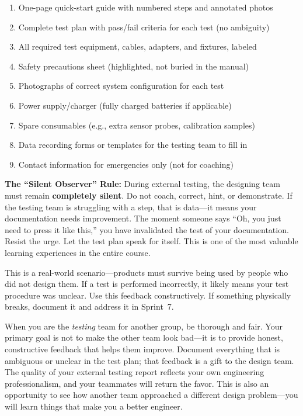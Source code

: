 \documentclass[11pt,letterpaper]{article}
\begin{document}
\begin{checklistbox}
\begin{enumerate}[leftmargin=*, itemsep=1pt, topsep=0pt]
    \item One-page quick-start guide with numbered steps and annotated photos
    \item Complete test plan with pass/fail criteria for each test (no ambiguity)
    \item All required test equipment, cables, adapters, and fixtures, labeled
    \item Safety precautions sheet (highlighted, not buried in the manual)
    \item Photographs of correct system configuration for each test
    \item Power supply/charger (fully charged batteries if applicable)
    \item Spare consumables (e.g., extra sensor probes, calibration samples)
    \item Data recording forms or templates for the testing team to fill in
    \item Contact information for emergencies only (not for coaching)
\end{enumerate}
\end{checklistbox}

\begin{warnbox}
\textbf{The ``Silent Observer'' Rule:} During external testing, the designing team must remain \textbf{completely silent}. Do not coach, correct, hint, or demonstrate. If the testing team is struggling with a step, that is data---it means your documentation needs improvement. The moment someone says ``Oh, you just need to press it like this,'' you have invalidated the test of your documentation. Resist the urge. Let the test plan speak for itself. This is one of the most valuable learning experiences in the entire course.
\end{warnbox}

\begin{faqbox}
This is a real-world scenario---products must survive being used by people who did not design them. If a test is performed incorrectly, it likely means your test procedure was unclear. Use this feedback constructively. If something physically breaks, document it and address it in Sprint~7.
\end{faqbox}

\begin{protip}
When you are the \textit{testing} team for another group, be thorough and fair. Your primary goal is not to make the other team look bad---it is to provide honest, constructive feedback that helps them improve. Document everything that is ambiguous or unclear in the test plan; that feedback is a gift to the design team. The quality of your external testing report reflects your own engineering professionalism, and your teammates will return the favor. This is also an opportunity to see how another team approached a different design problem---you will learn things that make you a better engineer.
\end{protip}
\end{document}

